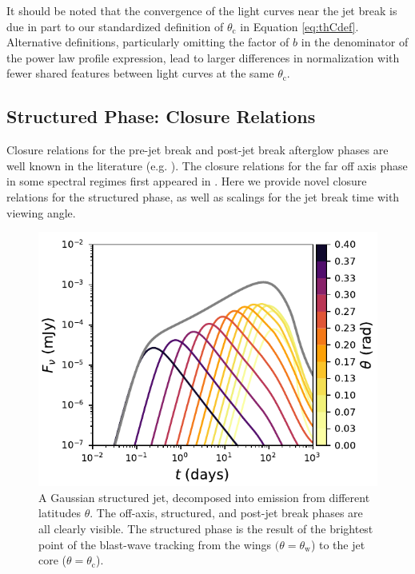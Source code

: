 \documentclass[twocolumn]{aastex62}
\newcommand{\thW}{\ensuremath{\theta_{\mathrm{w}}}}
\newcommand{\thC}{\ensuremath{\theta_{\mathrm{c}}}}
\begin{document}
It should be noted that the convergence of the light curves near the jet break is due in part to our standardized definition of $\thC$ in Equation \eqref{eq:thCdef}.  Alternative definitions, particularly omitting the factor of $b$ in the denominator of the power law profile expression, lead to larger differences in normalization with fewer shared features between light curves at the same $\thC$.  

\subsection{Structured Phase: Closure Relations}\label{subsec:structure}

Closure relations for the pre-jet break and post-jet break afterglow phases are well known in the literature (e.g. \citet{Granot:2002aa, Rhoads:1999aa}).  The closure relations for the far off axis phase in some spectral regimes first appeared in \citet{Salmonson:2003aa}.  Here we provide novel closure relations for the structured phase, as well as scalings for the jet break time with viewing angle.

\begin{figure}
	\includegraphics[width=\columnwidth]{figs/jetDecomp.pdf}
	\caption{A Gaussian structured jet, decomposed into emission from different latitudes $\theta$.  The off-axis, structured, and post-jet break phases are all clearly visible.  The structured phase is the result of the brightest point of the blast-wave tracking from the wings $(\theta =\thW$) to the jet core ($\theta=\thC$). \label{fig:decomp}}
\end{figure}
\end{document}
